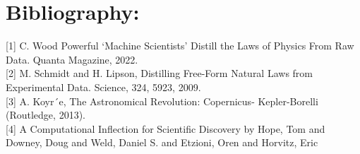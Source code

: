 \documentclass{article}
\begin{document}
\section{Bibliography: }

[1] C. Wood Powerful ‘Machine Scientists’ Distill the Laws of Physics From Raw Data. Quanta Magazine, 2022.\\ 

[2] M. Schmidt and H. Lipson, Distilling Free-Form Natural Laws from Experimental Data. Science, 324, 5923,
2009.\\

[3] A. Koyr´e, The Astronomical Revolution: Copernicus-
Kepler-Borelli (Routledge, 2013).\\ 

[4] A Computational Inflection for Scientific Discovery by Hope, Tom and Downey, Doug and Weld, Daniel S. and Etzioni, Oren and Horvitz, Eric\\
\end{document}
